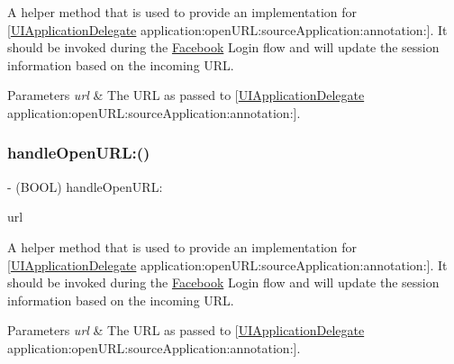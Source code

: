 A helper method that is used to provide an implementation for \mbox{[}\hyperlink{classUIApplicationDelegate-p}{U\+I\+Application\+Delegate} application\+:open\+U\+R\+L\+:source\+Application\+:annotation\+:\mbox{]}. It should be invoked during the \hyperlink{interfaceFacebook}{Facebook} Login flow and will update the session information based on the incoming U\+RL.


\begin{DoxyParams}{Parameters}
{\em url} & The U\+RL as passed to \mbox{[}\hyperlink{classUIApplicationDelegate-p}{U\+I\+Application\+Delegate} application\+:open\+U\+R\+L\+:source\+Application\+:annotation\+:\mbox{]}. \\
\hline
\end{DoxyParams}
\mbox{\label{interfaceFBSession_a99548fc3fd7dc7f5b8dc24019be88000}} 
\subsubsection{\texorpdfstring{handle\+Open\+U\+R\+L\+:()}{handleOpenURL:()}\hspace{0.1cm}{\footnotesize\ttfamily [4/5]}}
{\footnotesize\ttfamily -\/ (B\+O\+OL) handle\+Open\+U\+R\+L\+: \begin{DoxyParamCaption}\item[{(N\+S\+U\+RL $\ast$)}]{url }\end{DoxyParamCaption}}

A helper method that is used to provide an implementation for \mbox{[}\hyperlink{classUIApplicationDelegate-p}{U\+I\+Application\+Delegate} application\+:open\+U\+R\+L\+:source\+Application\+:annotation\+:\mbox{]}. It should be invoked during the \hyperlink{interfaceFacebook}{Facebook} Login flow and will update the session information based on the incoming U\+RL.


\begin{DoxyParams}{Parameters}
{\em url} & The U\+RL as passed to \mbox{[}\hyperlink{classUIApplicationDelegate-p}{U\+I\+Application\+Delegate} application\+:open\+U\+R\+L\+:source\+Application\+:annotation\+:\mbox{]}. \\
\hline
\end{DoxyParams}
\mbox{\label{interfaceFBSession_a99548fc3fd7dc7f5b8dc24019be88000}} 
